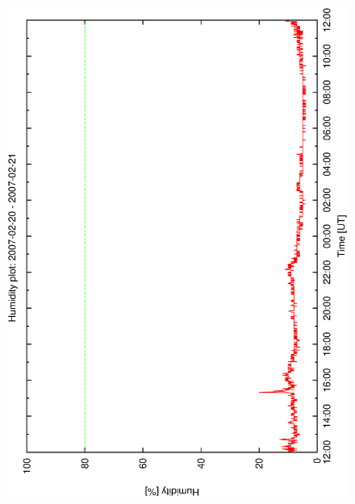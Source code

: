 \begin{figure}[htbp]
\begin{center}
{    \includegraphics[scale=0.25, angle=-90]{figures/ecs/hum_1_2007_02_20.eps}
  }
\end{center}
\end{figure}
